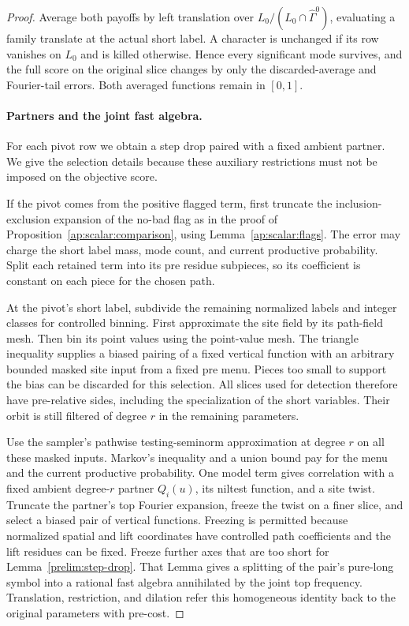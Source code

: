 \begin{proof}
Average both payoffs by left translation over
$L_0/(L_0\cap\widehat\Gamma^0)$, evaluating a family translate at
the actual short label.  A character is unchanged if its row
vanishes on $L_0$ and is killed otherwise.  Hence every significant
mode survives, and the full score on the original slice changes by
only the discarded-average and Fourier-tail errors.  Both averaged
functions remain in $[0,1]$.

\paragraph{Partners and the joint fast algebra.}

For each pivot row we obtain a step drop paired with a fixed
ambient partner.  We give the selection details because these
auxiliary restrictions must not be imposed on the objective score.

If the pivot comes from the positive flagged term, first truncate
the inclusion-exclusion expansion of the no-bad flag as in the
proof of Proposition~\ref{ap:scalar:comparison}, using
Lemma~\ref{ap:scalar:flags}.  The error may charge the short
label mass, mode count, and current productive probability.  Split
each retained term into its pre residue subpieces, so its coefficient
is constant on each piece for the chosen path.

At the pivot's short label, subdivide the remaining normalized labels
and integer classes for controlled binning.  First approximate the
site field by its path-field mesh.  Then bin its point values using
the point-value mesh.  The triangle inequality supplies a biased
pairing of a fixed vertical function with an arbitrary bounded
masked site input from a fixed pre menu.  Pieces too small to
support the bias can be discarded for this selection.  All slices
used for detection therefore have pre-relative sides, including
the specialization of the short variables.  Their orbit is still
filtered of degree $r$ in the remaining parameters.

Use the sampler's pathwise testing-seminorm approximation at
degree $r$ on all these masked inputs.  Markov's inequality and a
union bound pay for the menu and the current productive probability.
One model term gives correlation with a fixed ambient degree-$r$
partner $Q_i(u)$, its niltest function, and a site twist.  Truncate
the partner's top Fourier expansion, freeze the twist on a finer
slice, and select a biased pair of vertical functions.  Freezing is
permitted because normalized spatial and lift coordinates have
controlled path coefficients and the lift residues can be fixed.
Freeze further axes that are too short for
Lemma~\ref{prelim:step-drop}.  That Lemma gives a splitting of the
pair's pure-long symbol into a rational fast algebra annihilated by
the joint top frequency.  Translation, restriction, and dilation
refer this homogeneous identity back to the original parameters
with pre-cost.


\end{proof}
